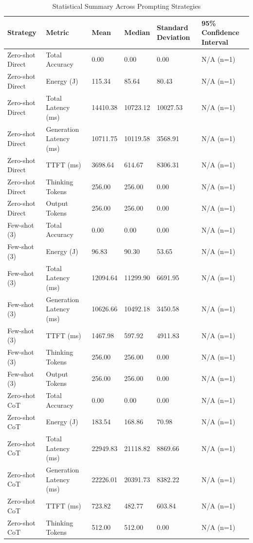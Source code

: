 \begin{table}
\caption{Statistical Summary Across Prompting Strategies}
\label{tab:statistical_summary}
\begin{tabular}{llllll}
\toprule
Strategy & Metric & Mean & Median & Standard Deviation & 95\% Confidence Interval \\
\midrule
Zero-shot Direct & Total Accuracy & 0.00 & 0.00 & 0.00 & N/A (n=1) \\
Zero-shot Direct & Energy (J) & 115.34 & 85.64 & 80.43 & N/A (n=1) \\
Zero-shot Direct & Total Latency (ms) & 14410.38 & 10723.12 & 10027.53 & N/A (n=1) \\
Zero-shot Direct & Generation Latency (ms) & 10711.75 & 10119.58 & 3568.91 & N/A (n=1) \\
Zero-shot Direct & TTFT (ms) & 3698.64 & 614.67 & 8306.31 & N/A (n=1) \\
Zero-shot Direct & Thinking Tokens & 256.00 & 256.00 & 0.00 & N/A (n=1) \\
Zero-shot Direct & Output Tokens & 256.00 & 256.00 & 0.00 & N/A (n=1) \\
Few-shot (3) & Total Accuracy & 0.00 & 0.00 & 0.00 & N/A (n=1) \\
Few-shot (3) & Energy (J) & 96.83 & 90.30 & 53.65 & N/A (n=1) \\
Few-shot (3) & Total Latency (ms) & 12094.64 & 11299.90 & 6691.95 & N/A (n=1) \\
Few-shot (3) & Generation Latency (ms) & 10626.66 & 10492.18 & 3450.58 & N/A (n=1) \\
Few-shot (3) & TTFT (ms) & 1467.98 & 597.92 & 4911.83 & N/A (n=1) \\
Few-shot (3) & Thinking Tokens & 256.00 & 256.00 & 0.00 & N/A (n=1) \\
Few-shot (3) & Output Tokens & 256.00 & 256.00 & 0.00 & N/A (n=1) \\
Zero-shot CoT & Total Accuracy & 0.00 & 0.00 & 0.00 & N/A (n=1) \\
Zero-shot CoT & Energy (J) & 183.54 & 168.86 & 70.98 & N/A (n=1) \\
Zero-shot CoT & Total Latency (ms) & 22949.83 & 21118.82 & 8869.66 & N/A (n=1) \\
Zero-shot CoT & Generation Latency (ms) & 22226.01 & 20391.73 & 8382.22 & N/A (n=1) \\
Zero-shot CoT & TTFT (ms) & 723.82 & 482.77 & 603.84 & N/A (n=1) \\
Zero-shot CoT & Thinking Tokens & 512.00 & 512.00 & 0.00 & N/A (n=1) \\

\end{tabular}
\end{table}
